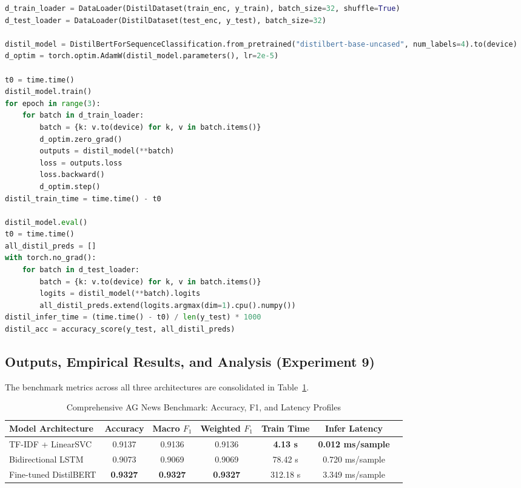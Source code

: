 \documentclass[12pt,a4paper]{report}
\begin{document}
\begin{lstlisting}[language=Python, caption={Complete Implementation of Experiment 9: AG News Topic Classification}, label={lst:exp9_code}]
d_train_loader = DataLoader(DistilDataset(train_enc, y_train), batch_size=32, shuffle=True)
d_test_loader = DataLoader(DistilDataset(test_enc, y_test), batch_size=32)

distil_model = DistilBertForSequenceClassification.from_pretrained("distilbert-base-uncased", num_labels=4).to(device)
d_optim = torch.optim.AdamW(distil_model.parameters(), lr=2e-5)

t0 = time.time()
distil_model.train()
for epoch in range(3):
    for batch in d_train_loader:
        batch = {k: v.to(device) for k, v in batch.items()}
        d_optim.zero_grad()
        outputs = distil_model(**batch)
        loss = outputs.loss
        loss.backward()
        d_optim.step()
distil_train_time = time.time() - t0

distil_model.eval()
t0 = time.time()
all_distil_preds = []
with torch.no_grad():
    for batch in d_test_loader:
        batch = {k: v.to(device) for k, v in batch.items()}
        logits = distil_model(**batch).logits
        all_distil_preds.extend(logits.argmax(dim=1).cpu().numpy())
distil_infer_time = (time.time() - t0) / len(y_test) * 1000
distil_acc = accuracy_score(y_test, all_distil_preds)
\end{lstlisting}

\subsection{Outputs, Empirical Results, and Analysis (Experiment 9)}
The benchmark metrics across all three architectures are consolidated in Table~\ref{tab:exp9_benchmark_results}.

\begin{table}[H]
\centering
\caption{Comprehensive AG News Benchmark: Accuracy, F1, and Latency Profiles}
\label{tab:exp9_benchmark_results}
\begin{tabular}{lcccccc}
\toprule
\textbf{Model Architecture} & \textbf{Accuracy} & \textbf{Macro $F_1$} & \textbf{Weighted $F_1$} & \textbf{Train Time} & \textbf{Infer Latency} \\
\midrule
TF-IDF + LinearSVC & 0.9137 & 0.9136 & 0.9136 & \textbf{4.13 s} & \textbf{0.012 ms/sample} \\
Bidirectional LSTM & 0.9073 & 0.9069 & 0.9069 & 78.42 s & 0.720 ms/sample \\
Fine-tuned DistilBERT & \textbf{0.9327} & \textbf{0.9327} & \textbf{0.9327} & 312.18 s & 3.349 ms/sample \\
\bottomrule
\end{tabular}
\end{table}
\end{document}
